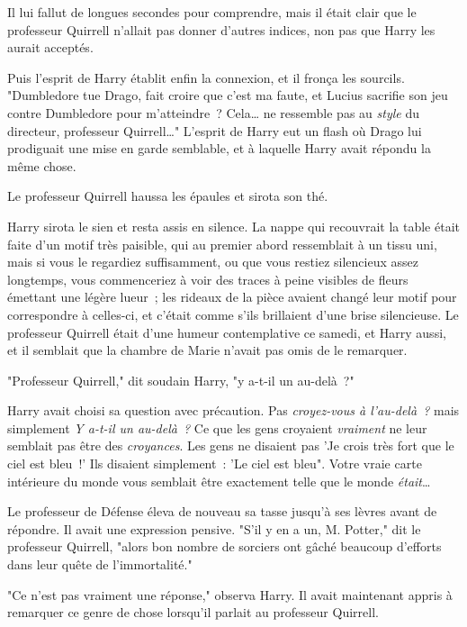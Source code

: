 Il lui fallut de longues secondes pour comprendre, mais il était clair que le professeur Quirrell n'allait pas donner d'autres indices, non pas que Harry les aurait acceptés.

Puis l'esprit de Harry établit enfin la connexion, et il fronça les sourcils. "Dumbledore tue Drago, fait croire que c'est ma faute, et Lucius sacrifie son jeu contre Dumbledore pour m'atteindre~? Cela… ne ressemble pas au \emph{style} du directeur, professeur Quirrell…" L'esprit de Harry eut un flash où Drago lui prodiguait une mise en garde semblable, et à laquelle Harry avait répondu la même chose.

Le professeur Quirrell haussa les épaules et sirota son thé.

Harry sirota le sien et resta assis en silence. La nappe qui recouvrait la table était faite d'un motif très paisible, qui au premier abord ressemblait à un tissu uni, mais si vous le regardiez suffisamment, ou que vous restiez silencieux assez longtemps, vous commenceriez à voir des traces à peine visibles de fleurs émettant une légère lueur~; les rideaux de la pièce avaient changé leur motif pour correspondre à celles-ci, et c'était comme s'ils brillaient d'une brise silencieuse. Le professeur Quirrell était d'une humeur contemplative ce samedi, et Harry aussi, et il semblait que la chambre de Marie n'avait pas omis de le remarquer.

"Professeur Quirrell," dit soudain Harry, "y a-t-il un au-delà~?"

Harry avait choisi sa question avec précaution. Pas \emph{croyez-vous à l'au-delà~?} mais simplement \emph{Y a-t-il un au-delà~?} Ce que les gens croyaient \emph{vraiment} ne leur semblait pas être des \emph{croyances}. Les gens ne disaient pas 'Je crois très fort que le ciel est bleu~!' Ils disaient simplement~: 'Le ciel est bleu". Votre vraie carte intérieure du monde vous semblait être exactement telle que le monde \emph{était}…

Le professeur de Défense éleva de nouveau sa tasse jusqu'à ses lèvres avant de répondre. Il avait une expression pensive. "S'il y en a un, M. Potter," dit le professeur Quirrell, "alors bon nombre de sorciers ont gâché beaucoup d'efforts dans leur quête de l'immortalité."

"Ce n'est pas vraiment une réponse," observa Harry. Il avait maintenant appris à remarquer ce genre de chose lorsqu'il parlait au professeur Quirrell.

